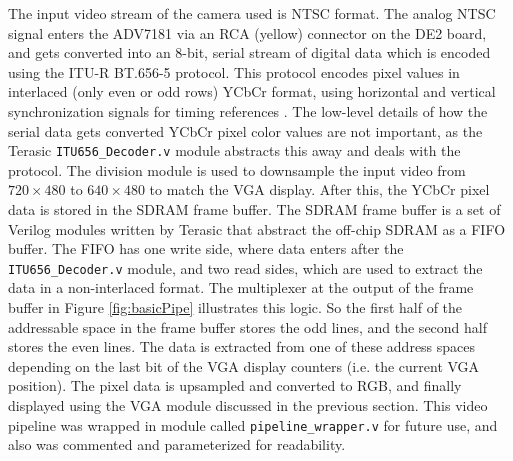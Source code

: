 \documentclass[11pt]{article} %
\begin{document}
The input video stream of the camera used is NTSC format. The analog NTSC signal enters the ADV7181 via an RCA (yellow) connector on the DE2 board, and gets converted into an 8-bit, serial stream of digital data which is encoded using the ITU-R BT.656-5 protocol. This protocol encodes pixel values in interlaced (only even or odd rows) YCbCr format, using horizontal and vertical synchronization signals for timing references \cite{itu}. The low-level details of how the serial data gets converted YCbCr pixel color values are not important, as the Terasic \texttt{ITU656\_Decoder.v} module abstracts this away and deals with the protocol. The division module is used to downsample the input video from $720 \times 480$ to $640 \times 480$ to match the VGA display. After this, the YCbCr pixel data is stored in the SDRAM frame buffer. The SDRAM frame buffer is a set of Verilog modules written by Terasic that abstract the off-chip SDRAM as a FIFO buffer. The FIFO has one write side, where data enters after the \texttt{ITU656\_Decoder.v} module, and two read sides, which are used to extract the data in a non-interlaced format. The multiplexer at the output of the frame buffer in Figure \ref{fig:basicPipe} illustrates this logic. So the first half of the addressable space in the frame buffer stores the odd lines, and the second half stores the even lines. The data is extracted from one of these address spaces depending on the last bit of the VGA display counters (i.e. the current VGA position). The pixel data is upsampled and converted to RGB, and finally displayed using the VGA module discussed in the previous section. This video pipeline was wrapped in module called \texttt{pipeline\_wrapper.v} for future use, and also was commented and parameterized for readability.
\end{document}

